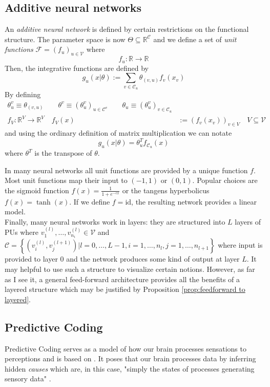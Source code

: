 \documentclass[a4paper,11pt]{article}
\begin{document}
\subsection{Additive neural networks}
\begin{Def}
An \emph{additive neural network} is defined by certain restrictions on the functional structure. The parameter space is now $\Theta\subseteq\mathbb{R}^{\mathcal{C}}$ and we define a set of \emph{unit functions} $\mathcal{F}=(f_u)_{u\in\mathcal{V}}$ where
\begin{equation}
f_u:\mathbb{R}\to\mathbb{R}
\end{equation}
Then, the integrative functions are defined by
\begin{equation}
g_u(x|\theta):=\sum_{v\in\mathcal{C}_u}\theta_{(v,u)}f_v(x_v)
\end{equation}
By defining
\begin{align}
\theta^v_u\equiv\theta_{(v,u)}\qquad\theta^v\equiv\left(\theta^v_u\right)_{u\in\mathcal{C}^v}\qquad\theta_u\equiv\left(\theta^v_u\right)_{v\in\mathcal{C}_u}\\
f_V:\mathbb{R}^V\to\mathbb{R}^V\quad f_V(x)&:=\left(f_v(x_v)\right)_{v\in V}\quad V\subseteq\mathcal{V}
\end{align}
and using the ordinary definition of matrix multiplication we can notate
\begin{equation}
g_u(x|\theta)=\theta_u^Tf_{\mathcal{C}_u}(x)
\end{equation}
where $\theta^T$ is the transpose of $\theta$.
\end{Def}
\begin{Abs}
In many neural networks all unit functions are provided by a unique function $f$. Most unit functions map their input to $(-1,1)$ or $(0,1)$. Popular choices are the sigmoid function $f(x)=\frac{1}{1+e^{-cx}}$ or the tangens hyperbolicus $f(x)=\tanh(x)$. If we define $f=\text{id}$, the resulting network provides a linear model.\\
Finally, many neural networks work in layers: they are structured into $L$ layers of PUs where $v_1^{(l)},\dotsc,v_{n_i}^{(l)}\in\mathcal{V}$ and $\mathcal{C}=\left\{(v_i^{(l)},v_j^{(l+1)})|l=0,\dotsc,L-1,i=1,\dotsc,n_l,j=1,\dotsc,n_{l+1}\right\}$ where input is provided to layer $0$ and the network produces some kind of output at layer $L$. It may helpful to use such a structure to visualize certain notions. However, as far as I see it, a general feed-forward architecture provides all the benefits of a layered structure which may be justified by Proposition \ref{prop:feedforward to layered}.
\end{Abs}
\subsection{Predictive Coding}
\begin{Abs}
Predictive Coding serves as a model of how our brain processes sensations to perceptions and is based on \cite{Mumford1992}. It poses that our brain processes data by inferring hidden \emph{causes} which are, in this case, "simply the states of processes generating sensory data" \cite[][819]{Friston2005}.
\end{Abs}
\printbibliography
\end{document}
